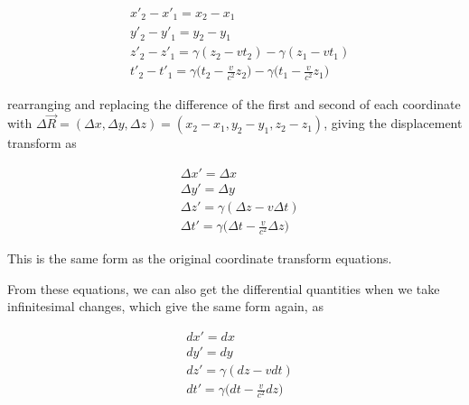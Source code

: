 \begin{equation}
	\begin{aligned}
		 & {x{'}}_2-{x{'}}_1 = x_2-x_1                                                                                         \\
		 & {y{'}}_2-{y{'}}_1 = y_2-y_1                                                                                         \\
		 & z{'}_2-z{'}_1 = {\gamma} ( z_2- {v} {t}_2)-{\gamma} ( z_1- {v} {t}_1)                                               \\
		 & {t{'}}_2-t{'}_1 = {\gamma} \bigg( {t}_2-\frac{v}{{c}^2} z_2 \bigg)-{\gamma} \bigg( {t}_1-\frac{v}{{c}^2} z_1 \bigg)
	\end{aligned}
\end{equation}

rearranging and replacing the difference of the first and second of each coordinate with ${\Delta}{\vec{R}} = ({\Delta}x,{\Delta}y,{\Delta}z) = (x_2-x_1,y_2-y_1,z_2-z_1)$, giving the displacement transform as

\begin{equation}
	\label{eq: interval of Coordinates}
	\begin{aligned}
		 & \Delta x{'} = {\Delta x}                                                   \\
		 & \Delta {y{'}} = {\Delta y}                                                 \\
		 & \Delta {z{'}} = {\gamma} ( {\Delta z}- {v} \Delta t)                       \\
		 & {\Delta t{'}} = {\gamma} \bigg( \Delta t-\frac{v}{{c}^2} {\Delta z} \bigg)
	\end{aligned}
\end{equation}

This is the same form as the original coordinate transform equations.

From these equations, we can also get the differential quantities when we take infinitesimal changes, which give the same form again, as

\begin{equation}
	\label{eq: infinitesimal interval of Coordinates}
	\begin{aligned}
		 & {dx{'}} = {dx}                                        \\
		 & {dy{'}} = {dy}                                        \\
		 & {dz{'}} = {\gamma} (dz- {v}dt)                        \\
		 & {dt{'}} = {\gamma} \bigg(dt-\frac{v}{{c}^2} dz \bigg)
	\end{aligned}
\end{equation}

